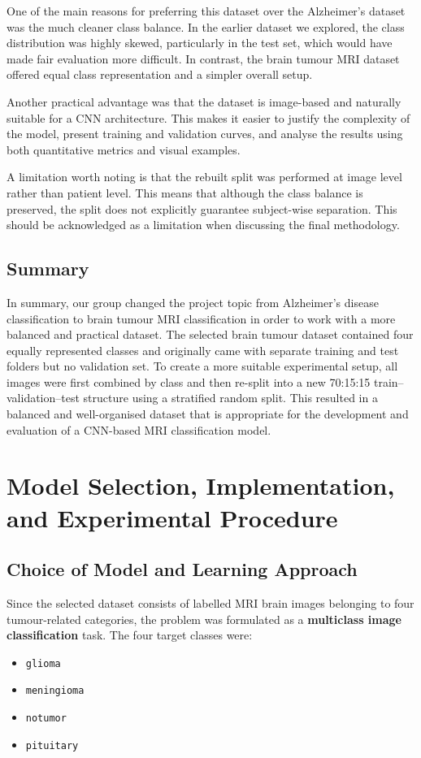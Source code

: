 \documentclass{article}
\begin{document}
One of the main reasons for preferring this dataset over the Alzheimer's dataset was the much cleaner class balance. In the earlier dataset we explored, the class distribution was highly skewed, particularly in the test set, which would have made fair evaluation more difficult. In contrast, the brain tumour MRI dataset offered equal class representation and a simpler overall setup.

Another practical advantage was that the dataset is image-based and naturally suitable for a CNN architecture. This makes it easier to justify the complexity of the model, present training and validation curves, and analyse the results using both quantitative metrics and visual examples.

A limitation worth noting is that the rebuilt split was performed at image level rather than patient level. This means that although the class balance is preserved, the split does not explicitly guarantee subject-wise separation. This should be acknowledged as a limitation when discussing the final methodology.

\subsection{Summary}

In summary, our group changed the project topic from Alzheimer's disease classification to brain tumour MRI classification in order to work with a more balanced and practical dataset. The selected brain tumour dataset contained four equally represented classes and originally came with separate training and test folders but no validation set. To create a more suitable experimental setup, all images were first combined by class and then re-split into a new 70:15:15 train--validation--test structure using a stratified random split. This resulted in a balanced and well-organised dataset that is appropriate for the development and evaluation of a CNN-based MRI classification model.

\section{Model Selection, Implementation, and Experimental Procedure}

\subsection{Choice of Model and Learning Approach}

Since the selected dataset consists of labelled MRI brain images belonging to four tumour-related categories, the problem was formulated as a \textbf{multiclass image classification} task. The four target classes were:
\begin{itemize}
    \item \texttt{glioma}
    \item \texttt{meningioma}
    \item \texttt{notumor}
    \item \texttt{pituitary}
\end{itemize}
\end{document}

